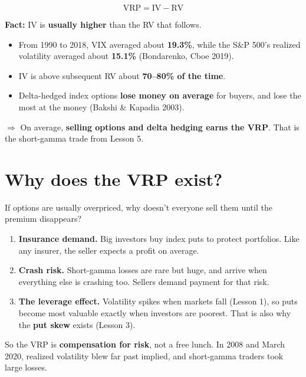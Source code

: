 \documentclass{article}
\begin{document}
\[\text{VRP} = \text{IV} - \text{RV}\]

\textbf{Fact:} IV is \textbf{usually higher} than the RV that follows.

\begin{itemize}

\item From 1990 to 2018, VIX averaged about \textbf{19.3\%}, while the S\&P 500's realized volatility averaged about \textbf{15.1\%} (Bondarenko, Cboe 2019).

\item IV is above subsequent RV about \textbf{70--80\% of the time}.

\item Delta-hedged index options \textbf{lose money on average} for buyers, and lose the most at the money (Bakshi \& Kapadia 2003).

\end{itemize}

\textbf{$\Rightarrow$} On average, \textbf{selling options and delta hedging earns the VRP}. That is the short-gamma trade from Lesson 5.

\section{Why does the VRP exist?}

If options are usually overpriced, why doesn't everyone sell them until the premium disappears?

\begin{enumerate}

\item \textbf{Insurance demand.} Big investors buy index puts to protect portfolios. Like any insurer, the seller expects a profit on average.

\item \textbf{Crash risk.} Short-gamma losses are rare but huge, and arrive when everything else is crashing too. Sellers demand payment for that risk.

\item \textbf{The leverage effect.} Volatility spikes when markets fall (Lesson 1), so puts become most valuable exactly when investors are poorest. That is also why the \textbf{put skew} exists (Lesson 3).

\end{enumerate}

So the VRP is \textbf{compensation for risk}, not a free lunch. In 2008 and March 2020, realized volatility blew far past implied, and short-gamma traders took large losses.
\end{document}

